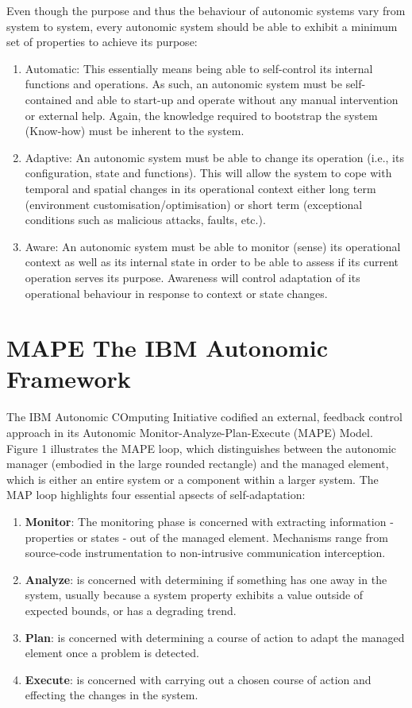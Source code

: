 Even though the purpose and thus the behaviour of autonomic systems vary from system to system, every autonomic system should be able to exhibit a minimum set of properties to achieve its purpose:
\begin{enumerate}
    \item Automatic: This essentially means being able to self-control its internal functions and operations. As such, an autonomic system must be self-contained and able to start-up and operate without any manual intervention or external help. Again, the knowledge required to bootstrap the system (Know-how) must be inherent to the system.
    \item Adaptive: An autonomic system must be able to change its operation (i.e., its configuration, state and functions). This will allow the system to cope with temporal and spatial changes in its operational context either long term (environment customisation/optimisation) or short term (exceptional conditions such as malicious attacks, faults, etc.).
    \item Aware: An autonomic system must be able to monitor (sense) its operational context as well as its internal state in order to be able to assess if its current operation serves its purpose. Awareness will control adaptation of its operational behaviour in response to context or state changes.
\end{enumerate}

\section{MAPE The IBM Autonomic Framework}
The IBM Autonomic COmputing Initiative codified an external, feedback control approach in its Autonomic Monitor-Analyze-Plan-Execute (MAPE) Model. Figure 1 illustrates the MAPE loop, which distinguishes between the autonomic manager (embodied in the large rounded rectangle) and the managed element, which is either an entire system or a component within a larger system. The MAP loop highlights four essential apsects of self-adaptation:
\begin{enumerate}
    \item \textbf{Monitor}: The monitoring phase is concerned with extracting information - properties or states - out of the managed element. Mechanisms range from source-code instrumentation to non-intrusive communication interception.
    \item \textbf{Analyze}: is concerned with determining if something has one away in the system, usually because a system property exhibits a value outside of expected bounds, or has a degrading trend.
    \item \textbf{Plan}: is concerned with determining a course of action to adapt the managed element once a problem is detected.
    \item \textbf{Execute}: is concerned with carrying out a chosen course of action and effecting the changes in the system.
\end{enumerate}
 
